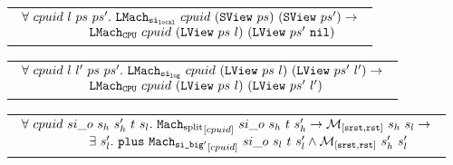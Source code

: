 \begin{lemma}
\begin{tabular}{P{0.95\textwidth}}
$
\begin{array}{l}
\forall \ cpuid \ l \ ps \ ps' .\ \singlelocalstep{cpuid}{(\singlelocalview{ps})}{(\singlelocalview{ps'})} \rightarrow \\
\ \ \ \ \ \ \ \ \ \ \ \ \ \ \ \ \hardwarelocalstep{cpuid}{(\localview{ps}{l})}{(\localview{ps'}{\nulllist})}\\
\end{array}
$
\end{tabular}
\end{lemma}


\begin{lemma}
\begin{tabular}{P{0.95\textwidth}}
$
\begin{array}{l}
\forall \ cpuid \ l \ l' \ ps \ ps' .\ \singlelogstep{cpuid}{(\localview{ps}{l})}{(\localview{ps'}{l'})} \rightarrow \\
\ \ \ \ \ \ \ \ \ \ \ \ \ \ \ \ \hardwarelocalstep{cpuid}{(\localview{ps}{l})}{(\localview{ps'}{l'})}\\
\end{array}
$
\end{tabular}
\end{lemma}



\begin{lemma}
\begin{tabular}{P{0.95\textwidth}}
$
\begin{array}{l}
\forall \ cpuid \ si\_o \ s_h \ s_h' \ t \ s_l . \ \singlesplitstep{cpuid}{si\_o}{s_h}{t}{s_h'} \rightarrow  \matchsrstaterstate{s_h}{s_l} \rightarrow \\
\ \ \ \ \ \ \ \ \ \ \ \ \ \ \ \ \exists\ s_l' . \  \ccplusstep{\singlebigtwostep{cpuid}{si\_o}{s_l}{t}{s_l'}} \wedge  \matchsrstaterstate{s_h'}{s_l'}\\
\end{array}
$
\end{tabular}
\end{lemma}




